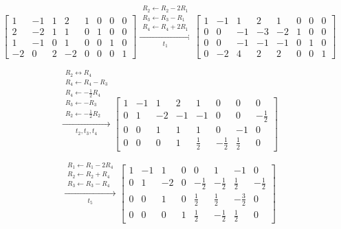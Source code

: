 \begin{enumerate}[label=\alph*)]
\begin{answer}
    $$
    \left[
    \begin{array}{rrrr|rrrr}
         1 & -1 & 1 & 2 & 1 & 0 & 0 & 0\\
         2 & -2 & 1 & 1 & 0 & 1 & 0 & 0\\
         1 & -1 & 0 & 1 & 0 & 0 & 1 & 0\\
        -2 & 0 & 2 & -2 & 0 & 0 & 0 & 1
    \end{array}
    \right]
    \xrightarrow[t_1]{
        \substack{
            R_2\leftarrow R_2-2R_1\\
            R_3\leftarrow R_3-R_1\\
            R_4\leftarrow R_4+2R_1
        }
    }
    \left[
    \begin{array}{rrrr|rrrr}
        1 & -1 & 1 & 2 & 1 & 0 & 0 & 0\\
        0 & 0 & -1 & -3 & -2 & 1 & 0 & 0\\
        0 & 0 & -1 & -1 & -1 & 0 & 1 & 0\\
        0 & -2 & 4 & 2 & 2 & 0 & 0 & 1
    \end{array}
    \right]
    $$

    $$
    \xrightarrow[t_2,t_3,t_4]{
        \substack{
            R_2\leftrightarrow R_4\\
            R_4\leftarrow R_4-R_3\\
            R_4\leftarrow-\frac12R_4\\
            R_3\leftarrow-R_3\\
            R_2\leftarrow-\frac12R_2
        }
    }
    \left[
    \begin{array}{rrrr|rrrr}
        1 & -1 & 1 & 2 & 1 & 0 & 0 & 0\\
        0 & 1 & -2 & -1 & -1 & 0 & 0 & -\frac12\\
        0 & 0 & 1 & 1 & 1 & 0 & -1 & 0\\
        0 & 0 & 0 & 1 & \frac12 & -\frac12 & \frac12 & 0
    \end{array}
    \right]
    $$

    $$
    \xrightarrow[t_5]{
        \substack{
            R_1\leftarrow R_1-2R_4\\
            R_2\leftarrow R_2+R_4\\
            R_3\leftarrow R_3-R_4
        }
    }
    \left[
    \begin{array}{rrrr|rrrr}
        1 & -1 & 1 & 0 & 0 & 1 & -1 & 0\\
        0 & 1 & -2 & 0 & -\frac12 & -\frac12 & \frac12 & -\frac12\\
        0 & 0 & 1 & 0 & \frac12 & \frac12 & -\frac32 & 0\\
        0 & 0 & 0 & 1 & \frac12 & -\frac12 & \frac12 & 0
    \end{array}
    \right]
    $$


\end{answer}
\end{enumerate}
